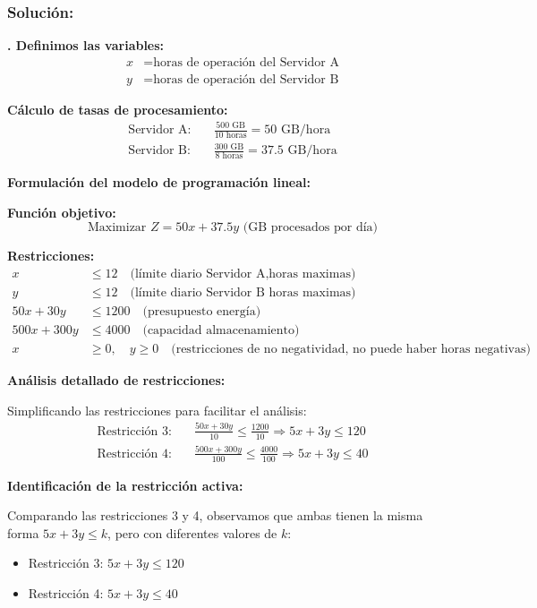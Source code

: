 \documentclass[12pt,a4paper]{article}
\begin{document}
\subsubsection*{Solución:}

\textbf{. Definimos las variables:}
\begin{align}
x &= \text{horas de operación del Servidor A}\\
y &= \text{horas de operación del Servidor B}
\end{align}

\textbf{ Cálculo de tasas de procesamiento:}
\begin{align}
\text{Servidor A:} \quad &\frac{500 \text{ GB}}{10 \text{ horas}} = 50 \text{ GB/hora}\\
\text{Servidor B:} \quad &\frac{300 \text{ GB}}{8 \text{ horas}} = 37.5 \text{ GB/hora}
\end{align}

\textbf{ Formulación del modelo de programación lineal:}

\textbf{Función objetivo:}
\[
\text{Maximizar } Z = 50x + 37.5y \text{ (GB procesados por día)}
\]

\textbf{Restricciones:}
\begin{align}
x &\leq 12 \quad \text{(límite diario Servidor A,horas maximas)}\\
y &\leq 12 \quad \text{(límite diario Servidor B horas maximas)}\\
50x + 30y &\leq 1200 \quad \text{(presupuesto energía)}\\
500x + 300y &\leq 4000 \quad \text{(capacidad almacenamiento)}\\
x &\geq 0, \quad y \geq 0 \quad \text{(restricciones de no negatividad, no puede haber horas negativas)}
\end{align}

\textbf{ Análisis detallado de restricciones:}

Simplificando las restricciones para facilitar el análisis:
\begin{align}
\text{Restricción 3:} \quad &\frac{50x + 30y}{10} \leq \frac{1200}{10} \Rightarrow 5x + 3y \leq 120\\
\text{Restricción 4:} \quad &\frac{500x + 300y}{100} \leq \frac{4000}{100} \Rightarrow 5x + 3y \leq 40
\end{align}

\textbf{Identificación de la restricción activa:}

Comparando las restricciones 3 y 4, observamos que ambas tienen la misma forma $5x + 3y \leq k$, pero con diferentes valores de $k$:
\begin{itemize}
\item Restricción 3: $5x + 3y \leq 120$
\item Restricción 4: $5x + 3y \leq 40$
\end{itemize}
\end{document}
